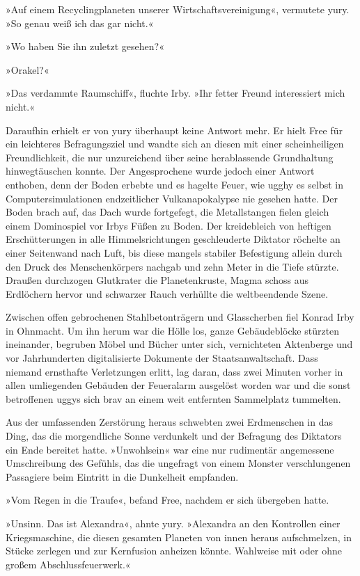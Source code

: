 »Auf einem Recyclingplaneten unserer Wirtschaftsvereinigung«, vermutete yury. »So genau weiß ich das gar nicht.«

»Wo haben Sie ihn zuletzt gesehen?«

»Orakel?«

»Das verdammte Raumschiff«, fluchte Irby. »Ihr fetter Freund interessiert mich nicht.«

Daraufhin erhielt er von yury überhaupt keine Antwort mehr. Er hielt Free für ein leichteres Befragungsziel und wandte sich an diesen mit einer scheinheiligen Freundlichkeit, die nur unzureichend über seine herablassende Grundhaltung hinwegtäuschen konnte. Der Angesprochene wurde jedoch einer Antwort enthoben, denn der Boden erbebte und es hagelte Feuer, wie ugghy es selbst in Computersimulationen endzeitlicher Vulkanapokalypse nie gesehen hatte. Der Boden brach auf, das Dach wurde fortgefegt, die Metallstangen fielen gleich einem Dominospiel vor Irbys Füßen zu Boden. Der kreidebleich von heftigen Erschütterungen in alle Himmelsrichtungen geschleuderte Diktator röchelte an einer Seitenwand nach Luft, bis diese mangels stabiler Befestigung allein durch den Druck des Menschenkörpers nachgab und zehn Meter in die Tiefe stürzte. Draußen durchzogen Glutkrater die Planetenkruste, Magma schoss aus Erdlöchern hervor und schwarzer Rauch verhüllte die weltbeendende Szene.

Zwischen offen gebrochenen Stahlbetonträgern und Glasscherben fiel Konrad Irby in Ohnmacht. Um ihn herum war die Hölle los, ganze Gebäudeblöcke stürzten ineinander, begruben Möbel und Bücher unter sich, vernichteten Aktenberge und vor Jahrhunderten digitalisierte Dokumente der Staatsanwaltschaft. Dass niemand ernsthafte Verletzungen erlitt, lag daran, dass zwei Minuten vorher in allen umliegenden Gebäuden der Feueralarm ausgelöst worden war und die sonst betroffenen uggys sich brav an einem weit entfernten Sammelplatz tummelten.

Aus der umfassenden Zerstörung heraus schwebten zwei Erdmenschen in das Ding, das die morgendliche Sonne verdunkelt und der Befragung des Diktators ein Ende bereitet hatte. »Unwohlsein« war eine nur rudimentär angemessene Umschreibung des Gefühls, das die ungefragt von einem Monster verschlungenen Passagiere beim Eintritt in die Dunkelheit empfanden.

»Vom Regen in die Traufe«, befand Free, nachdem er sich übergeben hatte.

»Unsinn. Das ist Alexandra«, ahnte yury. »Alexandra an den Kontrollen einer Kriegsmaschine, die diesen gesamten Planeten von innen heraus aufschmelzen, in Stücke zerlegen und zur Kernfusion anheizen könnte. Wahlweise mit oder ohne großem Abschlussfeuerwerk.«


